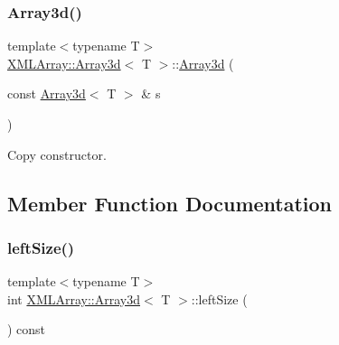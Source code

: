 \mbox{\label{classXMLArray_1_1Array3d_ab537a98b1435f3201b099ace57ab15bd}} 
\subsubsection{\texorpdfstring{Array3d()}{Array3d()}\hspace{0.1cm}{\footnotesize\ttfamily [9/9]}}
{\footnotesize\ttfamily template$<$typename T$>$ \\
\mbox{\hyperlink{classXMLArray_1_1Array3d}{X\+M\+L\+Array\+::\+Array3d}}$<$ T $>$\+::\mbox{\hyperlink{classXMLArray_1_1Array3d}{Array3d}} (\begin{DoxyParamCaption}\item[{const \mbox{\hyperlink{classXMLArray_1_1Array3d}{Array3d}}$<$ T $>$ \&}]{s }\end{DoxyParamCaption})\hspace{0.3cm}{\ttfamily [inline]}}



Copy constructor. 



\subsection{Member Function Documentation}
\mbox{\label{classXMLArray_1_1Array3d_a22b8137d2675f4e8f27d475abb217b7a}} 
\subsubsection{\texorpdfstring{leftSize()}{leftSize()}\hspace{0.1cm}{\footnotesize\ttfamily [1/3]}}
{\footnotesize\ttfamily template$<$typename T$>$ \\
int \mbox{\hyperlink{classXMLArray_1_1Array3d}{X\+M\+L\+Array\+::\+Array3d}}$<$ T $>$\+::left\+Size (\begin{DoxyParamCaption}{ }\end{DoxyParamCaption}) const\hspace{0.3cm}{\ttfamily [inline]}}



